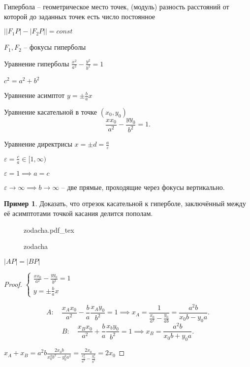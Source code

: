\documentclass{book}
\theoremstyle{definition}
\newtheorem*{example}{Пример}
\newcommand{\incfig}[1]{%
    \def\svgwidth{\columnwidth}
    {#1.pdf_tex}
}
\begin{document}
\begin{definition}
    Гипербола -- геометрическое место точек, (модуль)  разность расстояний от которой до заданных точек есть число постоянное

    $\left| \left| F_1P \right|  - \left| F_2P \right|  \right|  = const$


    $F_1, F_2$ -- фокусы гиперболы

    Уравнение гиперболы    $\frac{x^2}{a^2} - \frac{y^2}{b^2}=1$ 

    $c^2 = a^2+b^2$

    Уравнение асимптот $y = \pm \frac{b}{a}x$ 

    Уравнение касательной в точке $(x_0, y_0)$\[
    \frac{x x_0}{a^2} - \frac{y y_0}{b^2} = 1
    .\] 

    Уравнение директрисы  $x = \pm d = \frac{a}{\varepsilon}$ 

    $\varepsilon = \frac{c}{a}\in [1, \infty )$ 

    $\varepsilon=1 \implies a=c$

    $\varepsilon \to \infty \implies b\to \infty $ -- две прямые, проходящие через фокусы вертикально.

\end{definition}
\begin{example}
    Доказать, что отрезок касательной к гиперболе, заключённый между её асимптотами точкой касания делится пополам.
\begin{figure}[ht]
    \centering
    \incfig{zodacha}
    \caption{zodacha}
    \label{fig:zodacha}
\end{figure}

$\left| AP \right|  = \left| BP \right| $
\end{example}
\begin{proof}
    $\begin{cases}
        \frac{x x_0}{a^2} - \frac{y y_0}{b^2} = 1\\
        y = \pm \frac{b}{a}x
    \end{cases}$ 

    \[
    A:\quad \frac{x_Ax_0}{a^2} - \frac{b}{a}\frac{x_A y_0}{b^2} = 1\implies x_A = \frac{1}{\frac{x_0}{a^2} - \frac{y_0}{ab}} = \frac{a^2b}{x_0b-y_0a}
    .\] 
    \[
    B:\quad \frac{x_B x_0}{a^2} + \frac{b}{a}\frac{x_by_0}{b^2} = 1 \implies  x_B = \frac{a^2b}{x_0b+y_0a}
    .\] 

    $x_A + x_B = a^2 b \frac{2x_0b}{x_0^2b^2-y_0^2a^2} = \frac{2x_0}{\frac{x_0^2}{a^2} - \frac{y_0^2}{b^2}} = 2x_0$
\end{proof}
\end{document}
